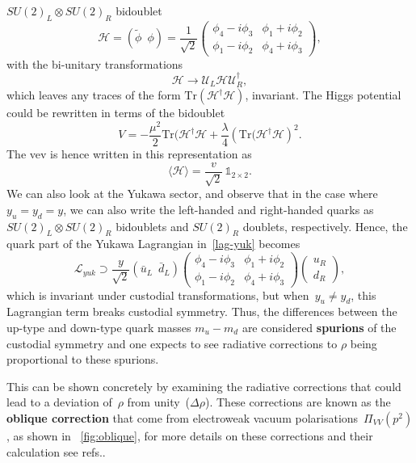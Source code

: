 $SU(2)_L \otimes SU(2)_R$ bidoublet 
\begin{equation}
	\mathcal{H} =(\tilde{\phi} \,\,\, \phi) = \frac{1}{\sqrt{2}}\begin{pmatrix}
		\phi_4-i\phi_3 & \phi_1+i\phi_2 \\
		\phi_1-i\phi_2 & \phi_4+i\phi_3
	\end{pmatrix},
\end{equation}
with the bi-unitary transformations
\begin{equation}
	\mathcal{H} \longrightarrow \mathcal{U}_L \mathcal{H} \mathcal{U}^\dagger_R,
\end{equation}
which leaves any traces of the form $\mathrm{Tr}(\mathcal{H}^\dagger\mathcal{H})$, invariant. The Higgs potential could be rewritten in terms of the bidoublet 
\begin{equation}
	V = -\frac{\mu^2}{2} \mathrm{Tr}(\mathcal{H}^\dagger\mathcal{H} + \frac{\lambda}{4}\left(  \mathrm{Tr}(\mathcal{H}^\dagger\mathcal{H} \right) ^2.
\end{equation}
The vev is hence written in this representation as 
\begin{equation}
	\langle \mathcal{H} \rangle  = \frac{v}{\sqrt{2}}\, \mathbb{1}_{2\times 2}.
\end{equation}
We can also look at the Yukawa sector, and observe that in the case where $ y_u =y_d =y $, we can also write the left-handed and right-handed quarks  as $SU(2)_L \otimes SU(2)_R$  bidoublets and $SU(2)_R$ doublets, respectively. Hence, the quark part of the Yukawa Lagrangian in~\eqref{lag-yuk} becomes
\begin{equation}
	\mathcal{L}_{yuk} \supset \frac{y}{\sqrt{2}}  (\bar u_L\,\,\, \bar d_L)  \begin{pmatrix}
		\phi_4-i\phi_3 & \phi_1+i\phi_2 \\
		\phi_1-i\phi_2 & \phi_4+i\phi_3  
	\end{pmatrix}  \begin{pmatrix}  u_R \\ d_R	\end{pmatrix} ,
\end{equation}
which is invariant under custodial transformations, but when~$ y_u \neq y_d$, this Lagrangian term breaks custodial symmetry. Thus, the differences between the up-type and down-type quark masses $m_u-m_d$ are considered \textbf{spurions} of the  custodial symmetry and one expects to see radiative corrections to $\rho$ being proportional to these spurions.
\par This can be shown concretely by examining the radiative corrections that could lead to a deviation of~$\rho$ from unity~($\Delta \rho$). These corrections are known as the \textbf{oblique correction} that come from electroweak vacuum polarisations~$\Pi_{VV}(p^2)$, as shown in ~\autoref{fig:oblique}, for more details on these corrections and their calculation see refs..~\cite{schwartz2014quantum,peskin1995introduction} \\
